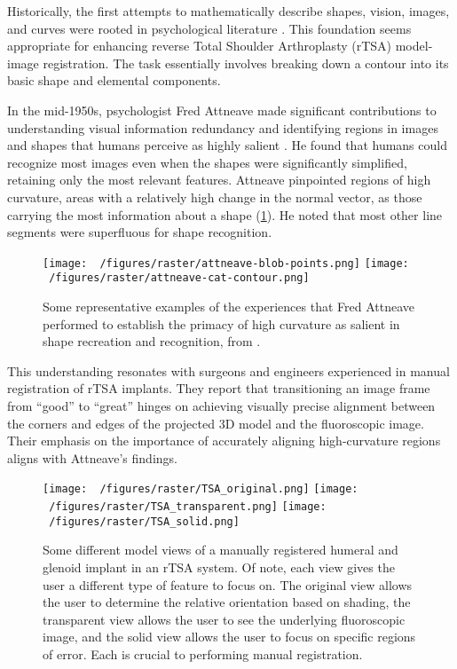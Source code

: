 Historically, the first attempts to mathematically describe shapes, vision, images, and curves were rooted in psychological literature \cite{attneaveInformationalAspectsVisual1954,attneaveQuantitativeStudyShape1956,koenderinkStructureImages1984,koenderinkSurfaceShapeCurvature1992}.
This foundation seems appropriate for enhancing reverse Total Shoulder Arthroplasty (rTSA) model-image registration.
The task essentially involves breaking down a contour into its basic shape and elemental components.

In the mid-1950s, psychologist Fred Attneave made significant contributions to understanding visual information redundancy and identifying regions in images and shapes that humans perceive as highly salient \cite{attneaveQuantitativeStudyShape1956,attneaveInformationalAspectsVisual1954}.
He found that humans could recognize most images even when the shapes were significantly simplified, retaining only the most relevant features.
Attneave pinpointed regions of high curvature, areas with a relatively high change in the normal vector, as those carrying the most information about a shape (\cref{fig:attneave}).
He noted that most other line segments were superfluous for shape recognition.

\begin{figure}[h!]
  \centering
  \texttt{[image: ~/figures/raster/attneave-blob-points.png]}
  \texttt{[image: ~/figures/raster/attneave-cat-contour.png]}
  \caption{Some representative examples of the experiences that Fred Attneave performed to establish the primacy of high curvature as salient in shape recreation and recognition, from \cite{attneaveInformationalAspectsVisual1954}.}
  \label{fig:attneave}
\end{figure}

This understanding resonates with surgeons and engineers experienced in manual registration of rTSA implants.
They report that transitioning an image frame from “good” to “great” hinges on achieving visually precise alignment between the corners and edges of the projected 3D model and the fluoroscopic image.
Their emphasis on the importance of accurately aligning high-curvature regions aligns with Attneave's findings.


\begin{figure}[h!]
  \centering
  \texttt{[image: ~/figures/raster/TSA\_original.png]}
  \texttt{[image: ~/figures/raster/TSA\_transparent.png]}
  \texttt{[image: ~/figures/raster/TSA\_solid.png]}
  \caption{Some different model views of a manually registered humeral and glenoid implant in an rTSA system. Of note, each view gives the user a different type of feature to focus on. The original view allows the user to determine the relative orientation based on shading, the transparent view allows the user to see the underlying fluoroscopic image, and the solid view allows the user to focus on specific regions of error. Each is crucial to performing manual registration.}
  \label{fig:TSA-multiview}
\end{figure}

